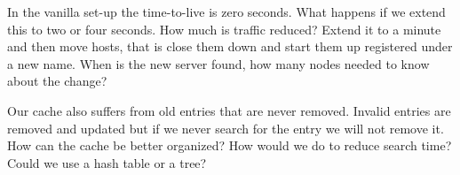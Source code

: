 \documentclass[a4paper, 11pt]{article}
\begin{document}
In the vanilla set-up the time-to-live is zero seconds. What happens
if we extend this to two or four seconds. How much is traffic
reduced?  Extend it to a minute and then move hosts, that is close
them down and start them up registered under a new name. When is the
new server found, how many nodes needed to know about the change?

Our cache also suffers from old entries that are never
removed. Invalid entries are removed and updated but if we never
search for the entry we will not remove it. How can the cache be
better organized? How would we do to reduce search time? Could we use
a hash table or a tree?
\end{document}
